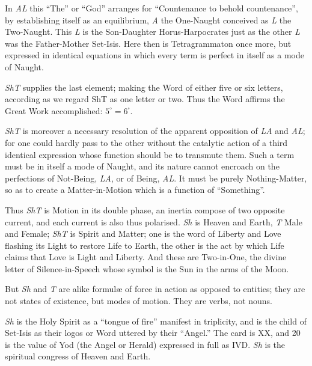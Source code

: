 In \textit{AL} this \enquote{The} or \enquote{God} arranges for \enquote{Countenance to behold countenance}, by establishing itself as an equilibrium, \textit{A} the One-Naught conceived as \textit{L} the Two-Naught. This \textit{L} is the Son-Daughter Horus-Harpocrates just as the other \textit{L} was the Father-Mother Set-Isis. Here then is Tetragrammaton once more, but expressed in identical equations in which every term is perfect in itself as a mode of Naught.

\textit{ShT} supplies the last element; making the Word of either five or six letters, according as we regard ShT as one letter or two. Thus the Word affirms the Great Work accomplished: $5^{\circ}=6^{\square}$.

\textit{ShT} is moreover a necessary resolution of the apparent opposition of \textit{LA} and \textit{AL}; for one could hardly pass to the other without the catalytic action of a third identical expression whose function should be to transmute them. Such a term must be in itself a mode of Naught, and its nature cannot encroach on the perfections of Not-Being, \textit{LA}, or of Being, \textit{AL}. It must be purely Nothing-Matter, so as to create a Matter-in-Motion which is a function of \enquote{Something}.

Thus \textit{ShT} is Motion in its double phase, an inertia compose of two opposite current, and each current is also thus polarised. \textit{Sh} is Heaven and Earth, \textit{T} Male and Female; \textit{ShT} is Spirit and Matter; one is the word of Liberty and Love flashing its Light to restore Life to Earth, the other is the act by which Life claims that Love is Light and Liberty. And these are Two-in-One, the divine letter of Silence-in-Speech whose symbol is the Sun in the arms of the Moon.

But \textit{Sh} and \textit{T} are alike formul\ae{} of force in action as opposed to entities; they are not states of existence, but modes of motion. They are verbs, not nouns.

\textit{Sh} is the Holy Spirit as a \enquote{tongue of fire} manifest in triplicity, and is the child of Set-Isis as their logos or Word uttered by their \enquote{Angel.} The card is XX, and 20 is the value of Yod (the Angel or Herald) expressed in full as IVD. \textit{Sh} is the spiritual congress of Heaven and Earth.

